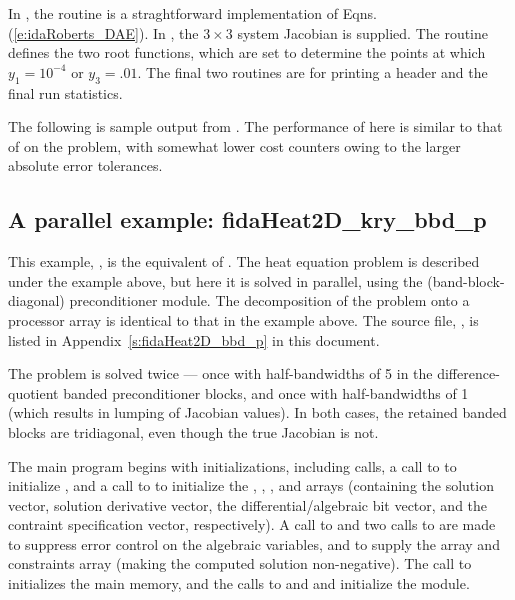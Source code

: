 In , the  routine is a straghtforward
implementation of Eqns. (\ref{e:idaRoberts_DAE}).  In , the 
$3 \times 3$ system Jacobian is supplied.  The  routine
defines the two root functions, which are set to determine the points at which
$y_1 = 10^{-4}$ or $y_3 = .01$.  The final two routines are for
printing a header and the final run statistics.

The following is sample output from .
The performance of {\fida} here is similar to that of {\ida} on
the  problem, with somewhat lower cost counters owing to
the larger absolute error tolerances.



\subsection{A parallel example: fidaHeat2D\_kry\_bbd\_p}\label{ss:fidaHeat2D_bbd_p}

This example, , is the {\F} equivalent of
.  The heat equation problem is described
under the  example above, but here it is solved in
parallel, using the {\idabbdpre} (band-block-diagonal) preconditioner
module.  The decomposition of the problem onto a processor array is
identical to that in the  example above.  The source file,
, is listed in Appendix~\ref{s:fidaHeat2D_bbd_p}
in this document.

The problem is solved twice --- once with half-bandwidths of 5 in the
difference-quotient banded preconditioner blocks, and once with
half-bandwidths of 1 (which results in lumping of Jacobian values).
In both cases, the retained banded blocks are tridiagonal, even though
the true Jacobian is not.

The main program begins with initializations, including {\mpi} calls,
a call to  to initialize {\nvecp}, and a call to
 to initialize the , , , and
 arrays (containing the solution vector, solution derivative vector,
the differential/algebraic bit vector, and the contraint specification
vector, respectively).  A call to  and two calls to
 are made to suppress error control on the algebraic
variables, and to supply the  array and constraints array (making
the computed solution non-negative).  The call to 
initializes the {\fida} main memory, and the calls to  and
 and initialize the {\fidabbd} module.

